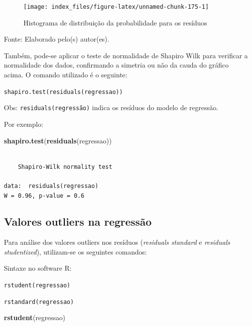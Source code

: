 \documentclass[12pt,brazil,oneside]{book}
\newenvironment{Shaded}{\begin{snugshade}}{\end{snugshade}}
\newcommand{\KeywordTok}[1]{\textcolor[rgb]{0.13,0.29,0.53}{\textbf{#1}}}
\newcommand{\NormalTok}[1]{#1}
\begin{document}
\begin{figure}[H]

{\centering \texttt{[image: index\_files/figure-latex/unnamed-chunk-175-1]} 

}

\caption{Histograma de distribuição da probabilidade para os resíduos}\label{fig:unnamed-chunk-175}
\end{figure}

Fonte: Elaborado pelo(s) autor(es).

Também, pode-se aplicar o teste de normalidade de Shapiro Wilk para verificar a normalidade dos dados, confirmando a simetria ou não da cauda do gráfico acima. O comando utilizado é o seguinte:

\texttt{shapiro.test(residuals(regressao))}

Obs: \texttt{residuals(regressão)} indica os resíduos do modelo de regressão.

Por exemplo:

\begin{Shaded}
\begin{Highlighting}[]
\KeywordTok{shapiro.test}\NormalTok{(}\KeywordTok{residuals}\NormalTok{(regressao))}
\end{Highlighting}
\end{Shaded}

\begin{verbatim}

    Shapiro-Wilk normality test

data:  residuals(regressao)
W = 0.96, p-value = 0.6
\end{verbatim}

\hypertarget{valores-outliers-na-regressao}{%
\subsection{Valores outliers na regressão}\label{valores-outliers-na-regressao}}

Para análise dos valores outliers nos resíduos (\emph{residuals standard} e \emph{residuals studentized}), utilizam-se os seguintes comandos:

Sintaxe no software R:

\texttt{rstudent(regressao)}

\texttt{rstandard(regressao)}

\begin{Shaded}
\begin{Highlighting}[]
\KeywordTok{rstudent}\NormalTok{(regressao)}
\end{Highlighting}
\end{Shaded}
\end{document}
